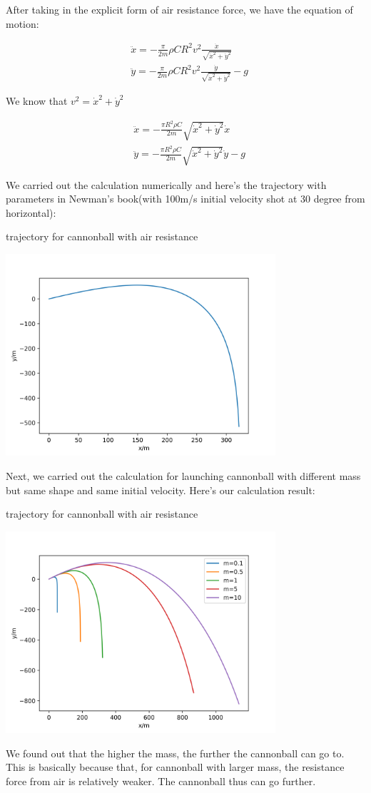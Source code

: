 \documentclass[letterpaper,12pt]{article}
\begin{document}
After taking in the explicit form of air resistance force, we have the equation of motion:

\begin{align}
    & \ddot{x} = -\frac{\pi}{2m} \rho C R^2 v^2 \frac{\dot{x}}{\sqrt{\dot{x}^2 + \dot{y}^2}}\\
    & \ddot{y} = -\frac{\pi}{2m} \rho C R^2 v^2 \frac{\dot{y}}{\sqrt{\dot{x}^2 + \dot{y}^2}} - g
\end{align}

We know that $v^2 = \dot{x}^2 + \dot{y}^2$

\begin{align}
    & \ddot{x} = -\frac{\pi R^2 \rho C}{2m}   \sqrt{\dot{x}^2 + \dot{y}^2} \dot{x}\\
    & \ddot{y} = -\frac{\pi R^2 \rho C}{2m}   \sqrt{\dot{x}^2 + \dot{y}^2} \dot{y} - g
\end{align}

We carried out the calculation numerically and here's the trajectory with parameters in Newman's book(with 100m/s initial velocity shot at 30 degree from horizontal):

\begin{table}[!h]
    \centering
    \caption{trajectory for cannonball with air resistance}
    \includegraphics[width=10cm]{9-7b.png}
\end{table}%
\newpage

Next, we carried out the calculation for launching cannonball with different mass but same shape and same initial velocity. Here's our calculation result:

\begin{table}[!h]
    \centering
    \caption{trajectory for cannonball with air resistance}
    \includegraphics[width=10cm]{9-7c.png}
\end{table}%

We found out that the higher the mass, the further the cannonball can go to. This is basically because that, for cannonball with larger mass, the resistance force from air is relatively weaker. The cannonball thus can go further.
\end{document}
